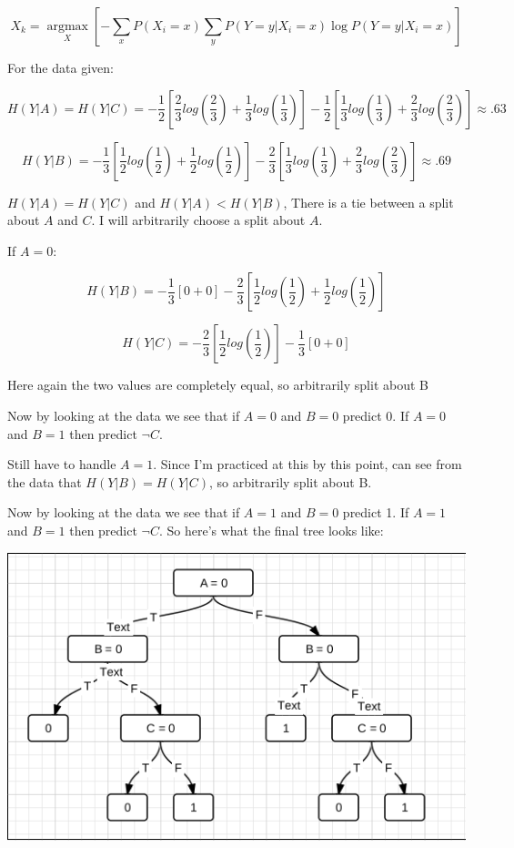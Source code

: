 \documentclass{article}
\begin{document}
\begin{enumerate}[(a)]
\[
X_k = \underset{X}{\operatorname{argmax}}
[-\sum_x P(X_i = x) \sum_y P(Y = y | X_i = x) \log P(Y = y | X_i = x)]
\]

For the data given:

\[
H(Y|A) = H(Y|C) = -\frac{1}{2}[\frac{2}{3} log(\frac{2}{3})
+ \frac{1}{3} log(\frac{1}{3})] - 
\frac{1}{2}[\frac{1}{3} log(\frac{1}{3})
+ \frac{2}{3} log(\frac{2}{3})] \approx .63
\]

\[
H(Y|B) = -\frac{1}{3}[\frac{1}{2} log(\frac{1}{2})
+ \frac{1}{2} log(\frac{1}{2})] - 
\frac{2}{3}[\frac{1}{3} log(\frac{1}{3})
+ \frac{2}{3} log(\frac{2}{3})] \approx .69
\]


$H(Y|A) = H(Y|C)$ and $H(Y|A) < H(Y|B)$, There is a tie between a split about
$A$ and $C$. I will arbitrarily choose a split about $A$.

\vspace{1em}

If $A = 0$:

\[
H(Y|B) = -\frac{1}{3}[0 + 0] - 
\frac{2}{3}[\frac{1}{2} log(\frac{1}{2})
+ \frac{1}{2} log(\frac{1}{2})]
\]

\[
H(Y|C) = -\frac{2}{3}[\frac{1}{2} log(\frac{1}{2})] - 
\frac{1}{3}[0+0]
\]

Here again the two values are completely equal, so arbitrarily split about B

\vspace{1em}

Now by looking at the data we see that if $A = 0$ and $B = 0$ predict 0. If
$A = 0$ and $B = 1$ then predict $\neg C$.

\vspace{1em}

Still have to handle $A = 1$. Since I'm practiced at this by this point, can
see from the data that $H(Y|B) = H(Y|C)$, so arbitrarily split about B.

\vspace{1em}

Now by looking at the data we see that if $A = 1$ and $B = 0$ predict 1. If
$A = 1$ and $B = 1$ then predict $\neg C$. So here's what the final tree looks
like:

\includegraphics[scale=0.65]{prob3c.png}

\end{enumerate}
\end{document}
